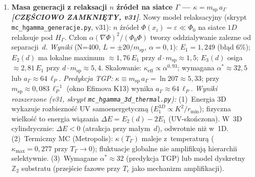 \begin{enumerate}[label=\textbf{O\arabic*}., start=16, nosep]
  \item \textbf{Masa generacji z relaksacji $n$ \'{z}r\'ode\l{} na siatce
        $\Gamma$ --- $\kappa = m_{\mathrm{sp}}\,a_\Gamma$
        \emph{[CZ\k{E}\'SCIOWO ZAMKNI\k{E}TY, v31]}}.
        Nowy model relaksacyjny (skrypt \texttt{mc\_hgamma\_generacje.py},
        v31): $n$ \'{z}r\'ode\l{} $\Phi(x_i) = \varepsilon \ll \Phi_0$
        na siatce $1D$ relaksuje pod $H_\Gamma$.
        Cz\l{}on $\alpha(\nabla\Phi)^2/(\Phi_0\Phi)$ tworzy
        oddzialywanie zalezne od separacji~$d$.
        \emph{Wyniki} (N=400, $L = \pm 20/m_{\mathrm{sp}}$, $\alpha=0{,}1$):
        $E_1 = 1{,}249$ (b\l{}\k{a}d 6\%);
        $E_2(d)$ ma lokalne maximum ${\approx}1{,}76\,E_1$ przy $d\cdot m_{\mathrm{sp}} \approx 1{,}5$;
        $E_3(d)$ osiga ${\approx}2{,}81\,E_1$ przy $d\cdot m_{\mathrm{sp}} \approx 5{,}4$.
        Skalowanie: $\kappa_{\mathrm{eff}} \propto \alpha^{0{,}93}$;
        wymagana $\alpha^* \approx 32{,}5$ lub $a_\Gamma \approx 64\,\ell_P$.
        \emph{Predykcja TGP:}
        $\kappa \equiv m_{\mathrm{sp}}\,a_\Gamma = \ln 207 \approx 5{,}33$;
        przy $m_{\mathrm{sp}} \approx 0{,}083\,\ell_P^{-1}$ (okno Efimova K13)
        wynika $a_\Gamma \approx 64\,\ell_P$.
        \emph{Wyniki rozszerzone (v31, skrypt \texttt{mc\_hgamma\_3d\_thermal.py}):}
        (1)~Energia 3D wykazuje rozbiezno\'s\'c UV samoenergetyczn\k{a}
        ($E_1^{3D} \propto K^2/r_{\min}$);
        fizyczna wielko\'s\'c to energia wi\k{a}zania
        $\Delta E = E_2(d) - 2E_1$ (UV-sko\'nczona).
        W~3D cylindrycznie: $\Delta E < 0$ (atrakcja przy ma\l{}ym~$d$),
        odwrotnie ni\.z w~1D.
        (2)~Termiczny MC (Metropolis): $\kappa(T_\Gamma)$ maleje z~temperatur\k{a}
        ($\kappa_{\max} = 0{,}277$ przy $T_\Gamma \to 0$);
        fluktuacje globalne nie amplifikuj\k{a} hierarchii selektywnie.
        (3)~Wymagane $\alpha^* \approx 32$ (predykcja TGP)
        lub model dyskretny $\mathbb{Z}_2$ substratu
        (przej\'scie fazowe przy $T_c$ jako mechanizm amplifikacji).
\end{enumerate}

